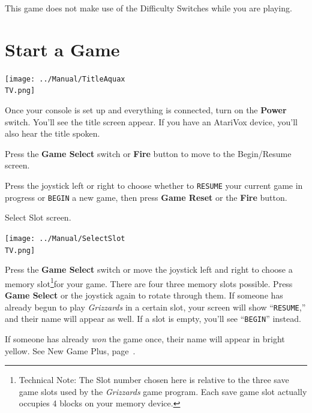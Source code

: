 \documentclass[10pt,twocolumn,openany,article]{memoir}
\newcommand\TV{NTSC}
\newcommand\TV{PAL}
\newcommand\TV{SECAM}
\begin{document}
This  game does  not  make  use of  the  Difficulty  Switches while  you
are playing. 

\fi

\section{Start a Game}

\begin{center}
  \texttt{[image: ../Manual/TitleAquax\\TV.png]}
\end{center}

Once your  console is set  up and everything  is connected, turn  on the
\textbf{Power} switch. You'll  see the title screen appear.  If you have
an AtariVox device, you'll also hear the title spoken.

Press the \textbf{Game Select} switch or \textbf{Fire} button to move to
the
\ifdefined\NOSAVE
Begin/Resume screen.

Press the  joystick left or  right to choose whether  to \texttt{RESUME}
your current game  in progress or \texttt{BEGIN} a new  game, then press
\textbf{Game Reset} or the \textbf{Fire} button.

\else
Select Slot screen.

\begin{center}
  \texttt{[image: ../Manual/SelectSlot\\TV.png]}
\end{center}

Press  the \textbf{Game  Select} switch  or move  the joystick  left and
right             to             choose             a             memory
slot\ifdefined\ATARIAGESAVE\else\footnote{Technical   Note:   The   Slot
  number chosen  here is relative to  the three save game  slots used by
  the  \textit{Grizzards} game  program.  Each save  game slot  actually
  occupies 4 blocks on your memory  device.}\fi for your game. There are
\ifdefined\ATARIAGESAVE  four \else  three  \fi  memory slots  possible.
Press \textbf{Game Select} or the joystick again to rotate through them.
If someone  has already  begun to play  \textit{Grizzards} in  a certain
slot, your  screen will  show ``\texttt{RESUME},''  and their  name will
appear    as    well.    If    a   slot    is    empty,    you'll    see
``\texttt{BEGIN}'' instead.

If someone has already \emph{won} the  game once, their name will appear
in bright yellow. See New Game Plus, page~\pageref{sec:NewGamePlus}.
\end{document}
